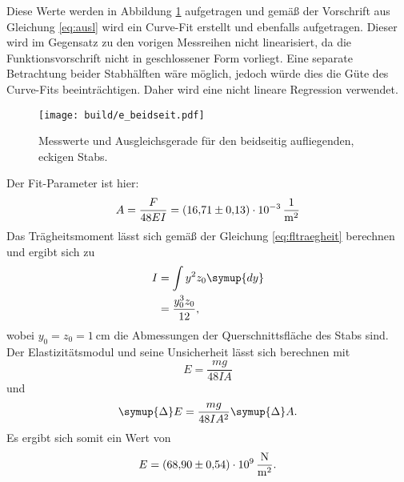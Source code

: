 \noindent Diese Werte werden in Abbildung \ref{fig:plot3} aufgetragen und gemäß der Vorschrift aus Gleichung \eqref{eq:ausl}
wird ein Curve-Fit erstellt und ebenfalls aufgetragen. Dieser wird im Gegensatz zu den vorigen 
Messreihen nicht linearisiert, da die Funktionsvorschrift nicht in geschlossener Form vorliegt. Eine 
separate Betrachtung beider Stabhälften wäre möglich, jedoch würde dies die Güte des Curve-Fits 
beeinträchtigen. Daher wird eine nicht lineare Regression verwendet.
\begin{figure}[H]
    \centering
    \texttt{[image: build/e\_beidseit.pdf]}
    \caption{Messwerte und Ausgleichsgerade für den beidseitig aufliegenden, eckigen Stabs.}
    \label{fig:plot3}
\end{figure}
\noindent Der Fit-Parameter ist hier:
\begin{equation}
    A = \frac{F}{48EI} = \SI{16.71\pm0.13e-3}{\per\meter\squared}
\end{equation}
Das Trägheitsmoment lässt sich gemäß der Gleichung \eqref{eq:fltraegheit} berechnen und ergibt sich zu
\begin{align}
    I &= \int y^2z_0 \symup{dy} \\
      &= \frac{y_0^3z_0}{12},
\end{align}
wobei $y_0=z_0=\SI{1}{\centi\meter}$ die Abmessungen der Querschnittsfläche des Stabs sind.
Der Elastizitätsmodul und seine Unsicherheit lässt sich berechnen mit
\begin{equation}
    E=\frac{mg}{48IA}
\end{equation}
und
\begin{equation}
    \symup{\Delta}E=\frac{mg}{48IA^2}\symup{\Delta}A.
\end{equation}
Es ergibt sich somit ein Wert von
\begin{equation}
    E = \SI{68.90\pm0.54e9}{\newton\per\meter\squared}.
\end{equation}
